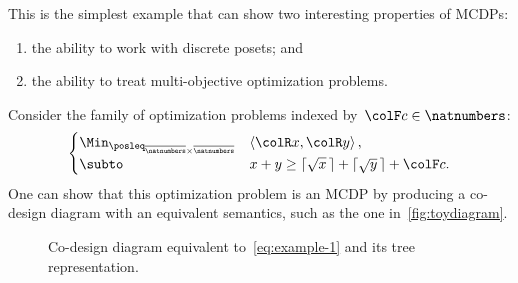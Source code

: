 This is the simplest example that can show two interesting properties
of MCDPs:
\begin{enumerate}
    \item the ability to work with discrete posets; and
    \item the ability to treat multi-objective optimization problems.
\end{enumerate}
Consider the family of optimization problems indexed by~${\colF c}\in\natnumbers$:
\begin{equation}
    \begin{cases}
        \Min_{\posleq_{\overline{\natnumbers}\times\overline{\natnumbers}}} & \left\langle {\colR x},{\colR y}\right\rangle ,\\
        \subto & x+y\geq\lceil\sqrt{x}\,\rceil+\lceil\sqrt{y}\,\rceil+{\colF c}.
    \end{cases}\label{eq:example-1}
\end{equation}
One can show that this optimization problem is an MCDP by producing
a co-design diagram with an equivalent semantics, such as the one
in~\cref{fig:toydiagram}.

\begin{figure}[h]

    \caption{Co-design diagram equivalent to~\cref{eq:example-1} and its tree representation.}
\end{figure}

